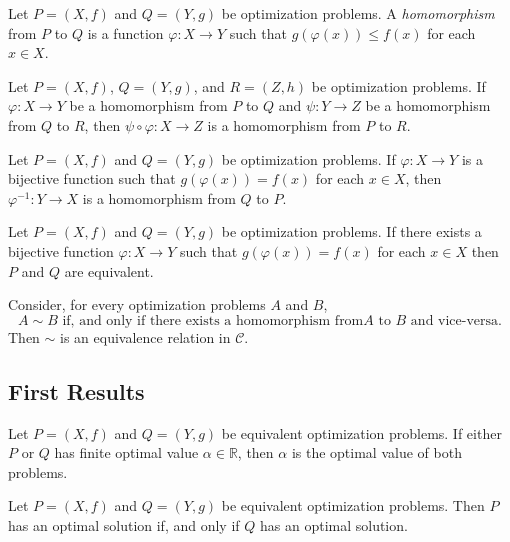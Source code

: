 \documentclass[a4paper]{article}
\begin{document}
\begin{definition}
  Let $P=(X,f)$ and $Q=(Y,g)$ be optimization problems. A \emph{homomorphism} from $P$ to $Q$ is a function $\varphi\colon X\to Y$ such that $g(\varphi(x))\leq f(x)$ for each $x\in X$.
\end{definition}

\begin{lemma}\label{optitrans}
  Let $P=(X,f)$, $Q=(Y,g)$, and $R=(Z,h)$ be optimization problems. If $\varphi\colon X\to Y$ be a homomorphism from $P$ to $Q$ and $\psi\colon Y\to Z$ be a homomorphism from $Q$ to $R$, then $\psi\circ\varphi\colon X\to Z$ is a homomorphism from $P$ to $R$. 
\end{lemma}

\begin{lemma}\label{equinv}
  Let $P=(X,f)$ and $Q=(Y,g)$ be optimization problems. If $\varphi\colon X\to Y$ is a bijective function such that $g(\varphi(x))=f(x)$ for each $x\in X$, then $\varphi^{-1}\colon Y\to X$ is a homomorphism from $Q$ to $P$.
\end{lemma}
\begin{corollary}\label{id}
  Let $P=(X,f)$ and $Q=(Y,g)$ be optimization problems. If there exists  a bijective function $\varphi\colon X\to Y$ such that $g(\varphi(x))=f(x)$ for each $x\in X$ then $P$ and $Q$ are equivalent.
\end{corollary}


\begin{lemma}
  Consider, for every optimization problems $A$ and $B$, $$A\sim B \text{ if, and
    only if  there exists a homomorphism from} A \text{ to } B \text{ and vice-versa.}$$
  Then $\sim$ is an equivalence relation in \(\mathcal{C}\).

\end{lemma}

\subsection*{First Results}
\begin{lemma}\label{samefiniteval}
  Let \(P=(X,f)\) and \(Q=(Y,g)\) be equivalent optimization problems. If either \(P\) or
  \(Q\) has finite optimal value \(\alpha\in\mathbb{R}\), then \(\alpha\) is the
  optimal value of both problems. 
\end{lemma}

\begin{lemma}\label{bothoptsols}
  Let \(P=(X,f)\) and \(Q=(Y,g)\) be equivalent optimization problems. Then \(P\) has an
  optimal solution if, and only if \(Q\) has an optimal solution.
\end{lemma}
\end{document}
